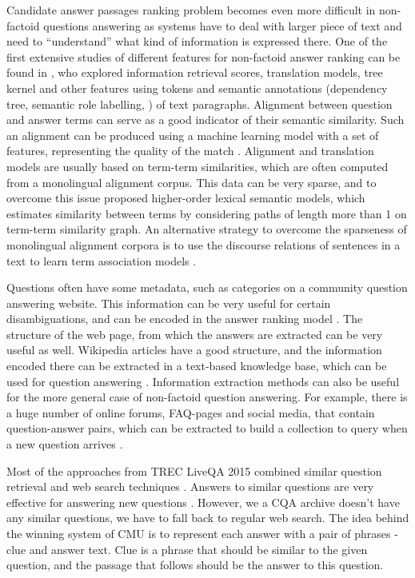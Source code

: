 Candidate answer passages ranking problem becomes even more difficult in non-factoid questions answering as systems have to deal with larger piece of text and need to ``understand'' what kind of information is expressed there.
One of the first extensive studies of different features for non-factoid answer ranking can be found in \cite{surdeanu2011learning}, who explored information retrieval scores, translation models, tree kernel and other features using tokens and semantic annotations (dependency tree, semantic role labelling, \etc) of text paragraphs.
Alignment between question and answer terms can serve as a good indicator of their semantic similarity.
Such an alignment can be produced using a machine learning model with a set of features, representing the quality of the match \cite{wang2015faq}.
Alignment and translation models are usually based on term-term similarities, which are often computed from a monolingual alignment corpus.
This data can be very sparse, and to overcome this issue \cite{fried2015higher} proposed higher-order lexical semantic models, which estimates similarity between terms by considering paths of length more than 1 on term-term similarity graph.
An alternative strategy to overcome the sparseness of monolingual alignment corpora is to use the discourse relations of sentences in a text to learn term association models \cite{sharp2015spinning}.

Questions often have some metadata, such as categories on a community question answering website.
This information can be very useful for certain disambiguations, and can be encoded in the answer ranking model \cite{zhou2015learning}.
The structure of the web page, from which the answers are extracted can be very useful as well.
Wikipedia articles have a good structure, and the information encoded there can be extracted in a text-based knowledge base, which can be used for question answering \cite{sondhi2014mining}.
Information extraction methods can also be useful for the more general case of non-factoid question answering.
For example, there is a huge number of online forums, FAQ-pages and social media, that contain question-answer pairs, which can be extracted to build a collection to query when a new question arrives \cite{cong2008finding,Jijkoun:2005:RAF:1099554.1099571,Yang:2009:ISK:1526709.1526735,ding2008using,li2011question}.

Most of the approaches from TREC LiveQA 2015 combined similar question retrieval and web search techniques \cite{ecnucs_liveqa15,savenkov_liveqa15,diwant_liveqa15}.
Answers to similar questions are very effective for answering new questions \cite{savenkov_liveqa15}.
However, we a CQA archive doesn't have any similar questions, we have to fall back to regular web search.
The idea behind the winning system of CMU \cite{diwant_liveqa15} is to represent each answer with a pair of phrases - clue and answer text.
Clue is a phrase that should be similar to the given question, and the passage that follows should be the answer to this question.

